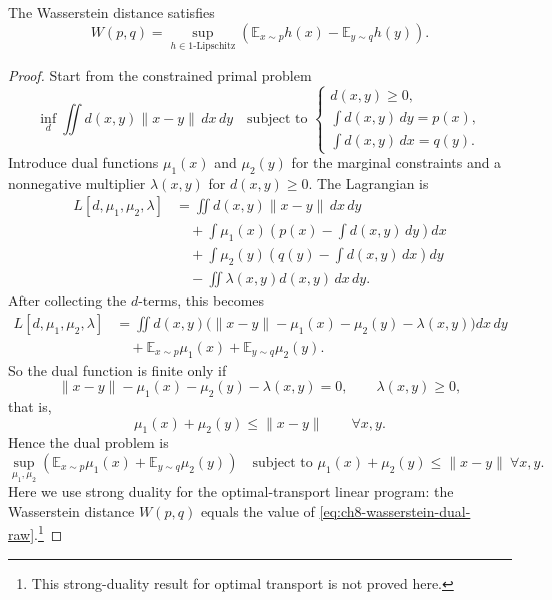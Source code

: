 \begin{theorem}
\label{thm:ch8-kr}
The Wasserstein distance satisfies
\[
  W(p,q)
  =
  \sup_{h\in 1\text{-Lipschitz}}
  \left(
    \mathbb{E}_{x\sim p} h(x)
    -
    \mathbb{E}_{y\sim q} h(y)
  \right).
\]
\end{theorem}
\begin{proof}
Start from the constrained primal problem
\[
  \inf_{d}
  \iint d(x,y)\|x-y\|\,dx\,dy
  \quad
  \text{subject to }
  \begin{cases}
    d(x,y)\ge 0, \\
    \int d(x,y)\,dy = p(x), \\
    \int d(x,y)\,dx = q(y).
  \end{cases}
\]
Introduce dual functions $\mu_1(x)$ and $\mu_2(y)$ for the marginal
constraints and a nonnegative multiplier $\lambda(x,y)$ for $d(x,y)\ge 0$.
The Lagrangian is
\begin{align*}
  L[d,\mu_1,\mu_2,\lambda]
  &=
  \iint d(x,y)\|x-y\|\,dx\,dy \\
  &\quad +
  \int \mu_1(x)
  \left(
    p(x) - \int d(x,y)\,dy
  \right)
  dx \\
  &\quad +
  \int \mu_2(y)
  \left(
    q(y) - \int d(x,y)\,dx
  \right)
  dy \\
  &\quad -
  \iint \lambda(x,y)d(x,y)\,dx\,dy.
\end{align*}
After collecting the $d$-terms, this becomes
\begin{align*}
  L[d,\mu_1,\mu_2,\lambda]
  &=
  \iint d(x,y)
  \bigl(
    \|x-y\|-\mu_1(x)-\mu_2(y)-\lambda(x,y)
  \bigr)
  dx\,dy \\
  &\quad +
  \mathbb{E}_{x\sim p}\mu_1(x)
  +
  \mathbb{E}_{y\sim q}\mu_2(y).
\end{align*}
So the dual function is finite only if
\[
  \|x-y\|-\mu_1(x)-\mu_2(y)-\lambda(x,y)=0,
  \qquad
  \lambda(x,y)\ge 0,
\]
that is,
\[
  \mu_1(x)+\mu_2(y)\le \|x-y\|
  \qquad \forall x,y.
\]
Hence the dual problem is
\begin{equation}
  \label{eq:ch8-wasserstein-dual-raw}
  \sup_{\mu_1,\mu_2}
  \left(
    \mathbb{E}_{x\sim p}\mu_1(x)
    +
    \mathbb{E}_{y\sim q}\mu_2(y)
  \right)
  \quad
  \text{subject to }
  \mu_1(x)+\mu_2(y)\le \|x-y\|
  \ \forall x,y.
\end{equation}
Here we use strong duality for the optimal-transport linear program: the
Wasserstein distance $W(p,q)$ equals the value of
\eqref{eq:ch8-wasserstein-dual-raw}.\footnote{This strong-duality result for
optimal transport is not proved here.} 


\end{proof}
